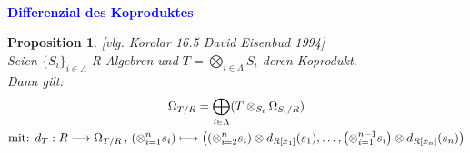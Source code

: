 \documentclass[10pt,a4paper]{report}
\newcommand{\ModulsOfDifferenzials}{David Eisenbud 1994}
\newcounter{Aussage}[chapter]
\newtheorem{prop}[Aussage]{Proposition}
\newcommand{\function}[5]{\nolinebreak{#1:#2 \longrightarrow #3 \, , \, #4 \longmapsto #5}}
\newcommand{\divR}[2]{\Omega_{#1/#2}}
\newcommand{\divf}[1]{d_{#1}}
\newcommand{\Tensor}[3]{#1 \otimes_{#2} #3}
\newcommand{\tensor}[3]{#1 \otimes #3}
\begin{document}
\ \\
\textcolor{blue}{\textbf{Differenzial des Koproduktes}}
\begin{prop} \label{Differenzial des Koproduktes} \textit{[vlg. Korolar 16.5 \ModulsOfDifferenzials]}\\
Seien $\lbrace S_i \rbrace_{i \in \Lambda}$ R-Algebren und $T = \bigotimes_{i \in \Lambda} S_i$ deren Koprodukt.\\
Dann gilt:
\begin{gather*}
\divR{T}{R} = \bigoplus_{i\in \Lambda} ( \Tensor{T}{S_i}{\divR{S_i}{R}} )\\
\text{mit: }\function{\divf{T}}{R}{\divR{T}{R}}{\left(\otimes_{i = 1}^n s_i\right)}{\left(\tensor{\left(\otimes_{i = 2}^n s_i\right)}{S_1}{\divf{R[x_1]}(s_1)},\dots,\tensor{\left( \otimes_{i = 1}^{n - 1} s_i \right)}{S_n}{\divf{R[x_n]}}(s_n)\right)}
\end{gather*}
\end{prop}
\end{document}
